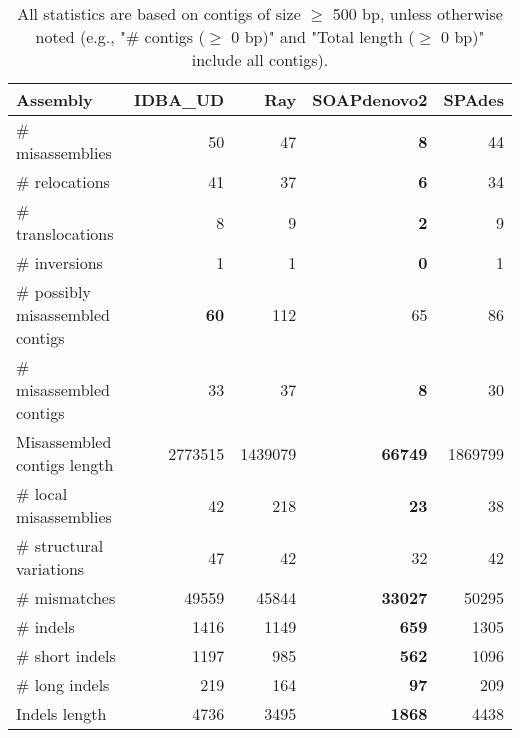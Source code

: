 \documentclass[12pt,a4paper]{article}
\begin{document}
\begin{table}[ht]
\begin{center}
\caption{All statistics are based on contigs of size $\geq$ 500 bp, unless otherwise noted (e.g., "\# contigs ($\geq$ 0 bp)" and "Total length ($\geq$ 0 bp)" include all contigs).}
\begin{tabular}{|l*{4}{|r}|}
\hline
Assembly & IDBA\_UD & Ray & SOAPdenovo2 & SPAdes \\ \hline
\# misassemblies & 50 & 47 & {\bf 8} & 44 \\ \hline
\hspace{5mm}\# relocations & 41 & 37 & {\bf 6} & 34 \\ \hline
\hspace{5mm}\# translocations & 8 & 9 & {\bf 2} & 9 \\ \hline
\hspace{5mm}\# inversions & 1 & 1 & {\bf 0} & 1 \\ \hline
\# possibly misassembled contigs & {\bf 60} & 112 & 65 & 86 \\ \hline
\# misassembled contigs & 33 & 37 & {\bf 8} & 30 \\ \hline
Misassembled contigs length & 2773515 & 1439079 & {\bf 66749} & 1869799 \\ \hline
\# local misassemblies & 42 & 218 & {\bf 23} & 38 \\ \hline
\# structural variations & 47 & 42 & 32 & 42 \\ \hline
\# mismatches & 49559 & 45844 & {\bf 33027} & 50295 \\ \hline
\# indels & 1416 & 1149 & {\bf 659} & 1305 \\ \hline
\hspace{5mm}\# short indels & 1197 & 985 & {\bf 562} & 1096 \\ \hline
\hspace{5mm}\# long indels & 219 & 164 & {\bf 97} & 209 \\ \hline
Indels length & 4736 & 3495 & {\bf 1868} & 4438 \\ \hline
\end{tabular}
\end{center}
\end{table}
\end{document}
